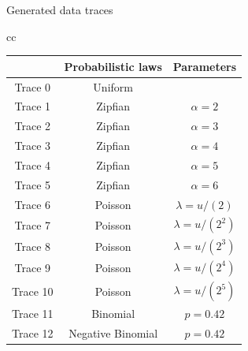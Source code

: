 \documentclass[mathserif]{beamer}
\begin{document}
\begin{frame}{Generated data traces}
\begin{center}
\begin{tabular}{cc}
		
		\begin{tabular}{|c|c|c|}
			\hline
			 & Probabilistic laws & Parameters \\
			 \hline
			Trace 0 & Uniform & \\
			Trace 1 & Zipfian & $\alpha = 2$ \\
			Trace 2 & Zipfian & $\alpha = 3$ \\
			Trace 3 & Zipfian & $\alpha = 4$ \\
			Trace 4 & Zipfian & $\alpha = 5$ \\ 
			Trace 5 & Zipfian & $\alpha = 6$ \\
			Trace 6 & Poisson & $\lambda = u/(2)$ \\
			Trace 7 & Poisson & $\lambda = u/(2^2)$ \\
			Trace 8 & Poisson & $\lambda = u/(2^3)$ \\
			Trace 9 & Poisson & $\lambda = u/(2^4)$ \\
			Trace 10 & Poisson & $\lambda = u/(2^5)$ \\
			Trace 11 & Binomial & $p = 0.42$ \\
			Trace 12 & Negative Binomial & $p = 0.42$ \\
			\hline
		\end{tabular}
		
		\end{tabular}
		
		\end{center}
	\end{frame}
	
\end{document}
